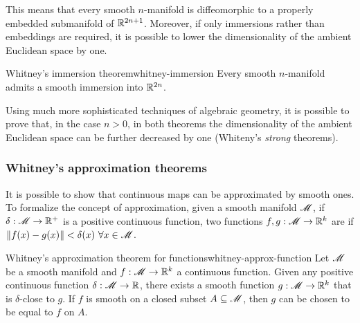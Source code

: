 
This means that every smooth $ n $-manifold is diffeomorphic to a properly embedded submanifold of $ \mathbb{R}^{2n+1} $. Moreover, if only immersions rather than embeddings are required, it is possible to lower the dimensionality of the ambient Euclidean space by one.

\begin{theorem}{Whitney's immersion theorem}{whitney-immersion}
  Every smooth $ n $-manifold admits a smooth immersion into $ \mathbb{R}^{2n} $.
\end{theorem}

Using much more sophisticated techniques of algebraic geometry, it is possible to prove that, in the case $ n > 0 $, in both theorems the dimensionality of the ambient Euclidean space can be further decreased by one (Whiteny's \emph{strong} theorems).

\subsubsection{Whitney's approximation theorems}

It is possible to show that continuous maps can be approximated by smooth ones. To formalize the concept of approximation, given a smooth manifold $ \mathscr{M} $, if $ \delta : \mathscr{M} \rightarrow \mathbb{R}^+ $ is a positive continuous function, two functions $ f , g : \mathscr{M} \rightarrow \mathbb{R}^k $ are  if $ \left\lVert f(x) - g(x)\right\rVert < \delta(x) \,\,\forall x \in \mathscr{M} $.

\begin{theorem}{Whitney's approximation theorem for functions}{whitney-approx-function}
  Let $ \mathscr{M} $ be a smooth manifold and $ f : \mathscr{M} \rightarrow \mathbb{R}^k $ a continuous function. Given any positive continuous function $ \delta : \mathscr{M} \rightarrow \mathbb{R} $, there exists a smooth function $ g : \mathscr{M} \rightarrow \mathbb{R}^k $ that is $ \delta $-close to $ g $. If $ f $ is smooth on a closed subset $ A \subseteq \mathscr{M} $, then $ g $ can be chosen to be equal to $ f $ on $ A $.
\end{theorem}

